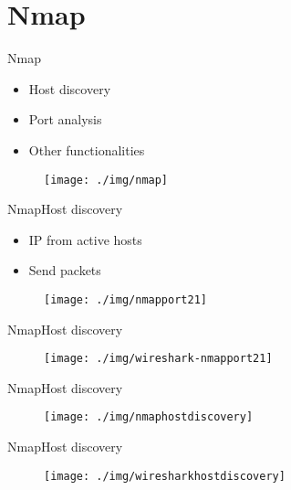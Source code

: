 \documentclass{beamer}
\begin{document}
\section{Nmap}
\begin{frame}{Nmap}
  \begin{itemize}
  \item Host discovery
  \item Port analysis
  \item Other functionalities
  \end{itemize}

        \begin{figure}[h]
    \centering
    \texttt{[image: ./img/nmap]}
  \end{figure}
\end{frame}

\begin{frame}{Nmap}{Host discovery}
  \begin{itemize}
  \item IP from active hosts
  \item Send packets
  \end{itemize}

          \begin{figure}[h]
    \centering
    \texttt{[image: ./img/nmapport21]}
  \end{figure}
\end{frame}

\begin{frame}{Nmap}{Host discovery}
          \begin{figure}[h]
    \centering
    \texttt{[image: ./img/wireshark-nmapport21]}
  \end{figure}
\end{frame}  

\begin{frame}{Nmap}{Host discovery}
          \begin{figure}[h]
    \centering
    \texttt{[image: ./img/nmaphostdiscovery]}
  \end{figure}
\end{frame}  

\begin{frame}{Nmap}{Host discovery}
          \begin{figure}[h]
    \centering
    \texttt{[image: ./img/wiresharkhostdiscovery]}
  \end{figure}
\end{frame}  
\end{document}
